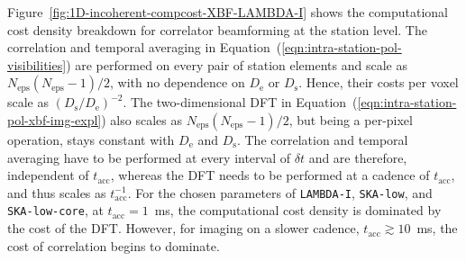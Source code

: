 \documentclass[
  journal=pasa,
  manuscript=article-type,
  year=2020,
  volume=37,
]{cup-journal}
\begin{document}
Figure~\ref{fig:1D-incoherent-compcost-XBF-LAMBDA-I} shows the computational cost density breakdown for correlator beamforming at the station level. The correlation and temporal averaging in Equation~(\ref{eqn:intra-station-pol-visibilities}) are performed on every pair of station elements and scale as $N_\textrm{eps}(N_\textrm{eps}-1)/2$, with no dependence on $D_\textrm{e}$ or $D_\textrm{s}$. Hence, their costs per voxel scale as $(D_\textrm{s}/D_\textrm{e})^{-2}$. The two-dimensional DFT in Equation~(\ref{eqn:intra-station-pol-xbf-img-expl}) also scales as $N_\textrm{eps}(N_\textrm{eps}-1)/2$, but being a per-pixel operation, stays constant with $D_\textrm{e}$ and $D_\textrm{s}$. The correlation and temporal averaging have to be performed at every interval of $\delta t$ and are therefore, independent of $t_\textrm{acc}$, whereas the DFT needs to be performed at a cadence of $t_\textrm{acc}$, and thus scales as $t_\textrm{acc}^{-1}$. For the chosen parameters of \texttt{LAMBDA-I}, \texttt{SKA-low}, and \texttt{SKA-low-core}, at $t_\textrm{acc}=1$~ms, the computational cost density is dominated by the cost of the DFT. However, for imaging on a slower cadence, $t_\textrm{acc}\gtrsim 10$~ms, the cost of correlation begins to dominate. 

\end{document}
